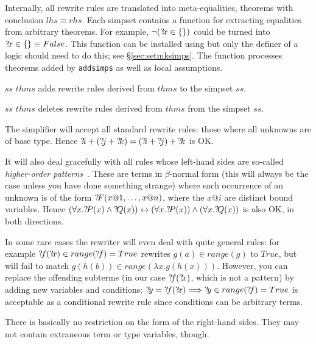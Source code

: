 Internally, all rewrite rules are translated into meta-equalities,
theorems with conclusion $lhs \equiv rhs$.  Each simpset contains a
function for extracting equalities from arbitrary theorems.  For
example, $\lnot({?\!x}\in \{\})$ could be turned into ${?\!x}\in \{\}
\equiv False$.  This function can be installed using
 but only the definer of a logic should need to do
this; see \S\ref{sec:setmksimps}.  The function processes theorems
added by \texttt{addsimps} as well as local assumptions.

\begin{ttdescription}
  
\item[$ss$ \ttindexbold{addsimps} $thms$] adds rewrite rules derived
  from $thms$ to the simpset $ss$.
  
\item[$ss$ \ttindexbold{delsimps} $thms$] deletes rewrite rules
  derived from $thms$ from the simpset $ss$.

\end{ttdescription}

\begin{warn}
  The simplifier will accept all standard rewrite rules: those where
  all unknowns are of base type.  Hence ${{?\!i}+({?\!j}+{?\!k})} =
  {({?\!i}+{?\!j})+{?\!k}}$ is OK.
  
  It will also deal gracefully with all rules whose left-hand sides
  are so-called {\em higher-order patterns}~\cite{nipkow-patterns}.
  These are terms in $\beta$-normal form (this will always be the case
  unless you have done something strange) where each occurrence of an
  unknown is of the form ${?\!F}(x@1,\dots,x@n)$, where the $x@i$ are
  distinct bound variables. Hence $(\forall x.{?\!P}(x) \land
  {?\!Q}(x)) \leftrightarrow (\forall x.{?\!P}(x)) \land (\forall
  x.{?\!Q}(x))$ is also OK, in both directions.
  
  In some rare cases the rewriter will even deal with quite general
  rules: for example ${{?\!f}({?\!x})\in range({?\!f})} = True$
  rewrites $g(a) \in range(g)$ to $True$, but will fail to match
  $g(h(b)) \in range(\lambda x.g(h(x)))$.  However, you can replace
  the offending subterms (in our case ${?\!f}({?\!x})$, which is not
  a pattern) by adding new variables and conditions: ${?\!y} =
  {?\!f}({?\!x}) \Longrightarrow {?\!y}\in range({?\!f}) = True$ is
  acceptable as a conditional rewrite rule since conditions can be
  arbitrary terms.
  
  There is basically no restriction on the form of the right-hand
  sides.  They may not contain extraneous term or type variables,
  though.
\end{warn}


